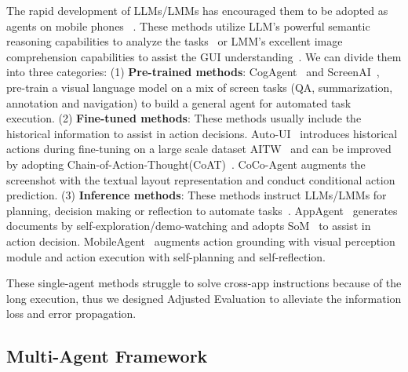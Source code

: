 The rapid development of LLMs/LMMs has encouraged them to be adopted as agents on mobile phones ~\cite{wen2023droidbot}. These methods utilize LLM's powerful semantic reasoning capabilities to analyze the tasks~\cite{venkatesh2022ugif,wang2023enabling} or LMM's excellent image comprehension capabilities to assist the GUI understanding~\cite{yan2023gpt, zheng2024gpt}. We can divide them into three categories:
(1) \textbf{Pre-trained methods}: CogAgent~\cite{hong2024cogagent} and ScreenAI~\cite{baechler2024screenai}, pre-train a visual language model on a mix of screen tasks (QA, summarization, annotation and navigation) to build a general agent for automated task execution.
(2) \textbf{Fine-tuned methods}: These methods usually include the historical information to assist in action decisions. 
Auto-UI~\cite{zhan2023you} introduces historical actions during fine-tuning on a large scale dataset AITW~\cite{rawles2024androidinthewild} and can be improved by adopting Chain-of-Action-Thought(CoAT)~\cite{zhang2024android}. 
CoCo-Agent\cite{ma2024comprehensive} augments the screenshot with the textual layout representation and conduct conditional action prediction. 
(3) \textbf{Inference methods}: These methods instruct LLMs/LMMs for planning, decision making or reflection to automate tasks~\cite{deng2024mobile}.
AppAgent~\cite{yang2023appagent} generates documents by self-exploration/demo-watching and adopts SoM~\cite{yang2023set} to assist in action decision. 
MobileAgent~\cite{wang2024mobile} augments action grounding with visual perception module and action execution with self-planning and self-reflection.

These single-agent methods struggle to solve cross-app instructions because of the long execution, thus we designed Adjusted Evaluation to alleviate the information loss and error propagation.

\subsection{Multi-Agent Framework}

